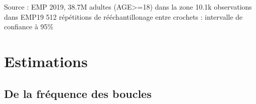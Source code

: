 \documentclass[
  9pt,
  a4paper,
  DIV=11]{scrreprt}
\begin{document}
\begin{minipage}{\linewidth}
Source : EMP 2019,
38.7M adultes (AGE\textgreater{}=18) dans la zone
10.1k observations dans EMP19
512 répétitions de rééchantillonage
entre crochets : intervalle de confiance à 95\%\\
\end{minipage}

\chapter{Estimations}\label{estimations}

\section{De la fréquence des
boucles}\label{de-la-fruxe9quence-des-boucles}
\end{document}

